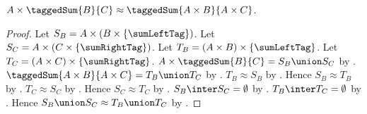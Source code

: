 \begin{proposition}\label{times_tagged_sum_equinum_distributive}
    $A\times\taggedSum{B}{C}
        \approx\taggedSum{A\times B}{A\times C}$.
\end{proposition}
\begin{proof}
    Let $S_B=A\times(B\times\{\sumLeftTag\})$.
    Let $S_C=A\times(C\times\{\sumRightTag\})$.
    Let $T_B=(A\times B)\times\{\sumLeftTag\}$.
    Let $T_C=(A\times C)\times\{\sumRightTag\}$.
    $A\times\taggedSum{B}{C}=S_B\union S_C$
        by .
    $\taggedSum{A\times B}{A\times C}=T_B\union T_C$
        by .
    $T_B\approx S_B$ by .
    Hence $S_B\approx T_B$ by .
    $T_C\approx S_C$ by .
    Hence $S_C\approx T_C$ by .
    $S_B\inter S_C=\emptyset$
        by
        .
    $T_B\inter T_C=\emptyset$
        by .
    Hence $S_B\union S_C\approx T_B\union T_C$
        by .
\end{proof}
